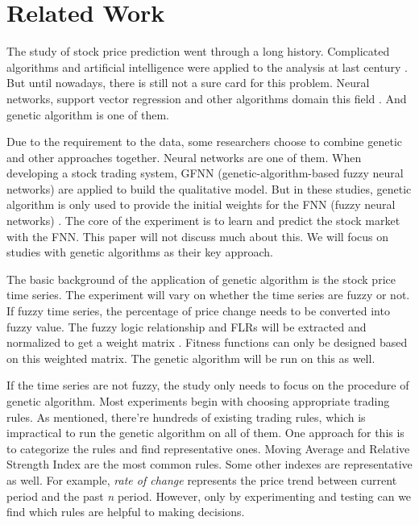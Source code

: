 \documentclass{article}
\begin{document}


\section{Related Work}

The study of stock price prediction went through a long history.
Complicated algorithms and artificial intelligence were applied to the analysis at last century
\cite{application-of-neural-network-to-technical-analysis}.
But until nowadays, there is still not a sure card for this problem.
Neural networks, support vector regression and other algorithms domain this field
\cite{textual-analysis-of-stock-market-prediction}.
And genetic algorithm is one of them.

Due to the requirement to the data, some researchers choose to combine genetic and other approaches together.
Neural networks are one of them.
When developing a stock trading system, GFNN (genetic-algorithm-based fuzzy neural networks)
are applied to build the qualitative model.
But in these studies, genetic algorithm is only used to provide the initial weights
for the FNN (fuzzy neural networks) \cite{an-intelligent-stock-trading-decision-support-system}.
The core of the experiment is to learn and predict the stock market with the FNN.
This paper will not discuss much about this.
We will focus on studies with genetic algorithms as their key approach.

The basic background of the application of genetic algorithm is the stock price time series.
The experiment will vary on whether the time series are fuzzy or not.
If fuzzy time series, the percentage of price change needs to be converted into fuzzy value.
The fuzzy logic relationship and FLRs will be extracted and normalized to get a weight matrix
\cite{a-novel-stock-forecasting-model-based-on-fuzzy-time-series}.
Fitness functions can only be designed based on this weighted matrix.
The genetic algorithm will be run on this as well.

If the time series are not fuzzy, the study only needs to focus on the procedure of genetic algorithm.
Most experiments begin with choosing appropriate trading rules.
As mentioned, there're hundreds of existing trading rules,
which is impractical to run the genetic algorithm on all of them.
One approach for this is to categorize the rules and find representative ones.
Moving Average and Relative Strength Index are the most common rules.
Some other indexes are representative as well.
For example, \emph{rate of change} represents the price trend between current period and the past \emph{n} period.
However, only by experimenting and testing can we find which rules are helpful to making decisions.
\end{document}

